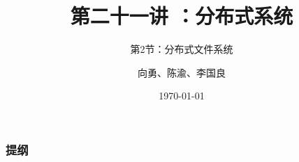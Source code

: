 
\usepackage{tcolorbox}

\title[第21讲]{第二十一讲 ：分布式系统} %
\subtitle{第2节：分布式文件系统}
\author{向勇、陈渝、李国良} %
\date{\today} %


    
    \begin{frame}
        \titlepage %
    \end{frame}
    
    \begin{frame}
        \frametitle{提纲} %
        \tableofcontents %
        
        
    \end{frame}
